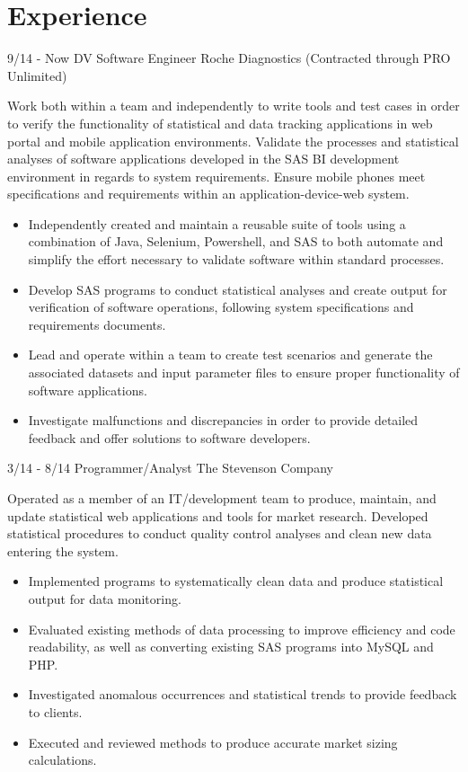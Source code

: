 \documentclass[]{moak-resume}
\begin{document}
\section{Experience}
\begin{entrylist}
  \entry
    {9/14 - Now}
    {DV Software Engineer}
    {Roche Diagnostics (Contracted through PRO Unlimited)}
    {Work both within a team and independently to write tools and test cases in order to verify the functionality of statistical and data tracking applications in web portal and mobile application environments. Validate the processes and statistical analyses of software applications developed in the SAS BI development environment in regards to system requirements. Ensure mobile phones meet specifications and requirements within an application-device-web system.
    	\begin{itemize}
    		\item Independently created and maintain a reusable suite of tools using a combination of Java, Selenium, Powershell, and SAS to both automate and simplify the effort necessary to validate software within standard processes.
    		\item Develop SAS programs to conduct statistical analyses and create output for verification of software operations, following system specifications and requirements documents.
    		\item Lead and operate within a team to create test scenarios and generate the associated datasets and input parameter files to ensure proper functionality of software applications.
    		\item Investigate malfunctions and discrepancies in order to provide detailed feedback and offer solutions to software developers.
    	\end{itemize}}
  \entry
    {3/14 - 8/14}
    {Programmer/Analyst}
    {The Stevenson Company}
    {Operated as a member of an IT/development team to produce, maintain, and update statistical web applications and tools for market research. Developed statistical procedures to conduct quality control analyses and clean new data entering the system.
    	\begin{itemize}
    		\item Implemented programs to systematically clean data and produce statistical output for data monitoring.
     		\item Evaluated existing methods of data processing to improve efficiency and code readability, as well as converting existing SAS programs into MySQL and PHP.
     		\item Investigated anomalous occurrences and statistical trends to provide feedback to clients.
     		\item Executed and reviewed methods to produce accurate market sizing calculations.
    	\end{itemize}}
\end{entrylist}
\\
\end{document}
